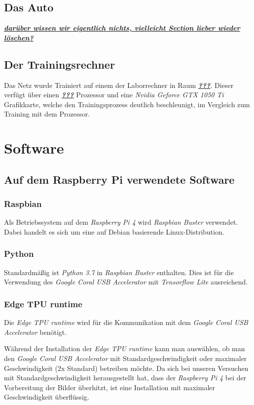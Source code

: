 \documentclass[a4paper, 12pt]{scrartcl}
\begin{document}
		
		\subsection{Das Auto}
		\textbf{\textit{\underline{darüber wissen wir eigentlich nichts, vielleicht Section lieber wieder löschen?}}}
	
	
		\subsection{Der Trainingsrechner}
		Das Netz wurde Trainiert auf einem der Laborrechner in Raum \textbf{\textit{\underline{???}}}. Dieser verfügt über einen \textbf{\textit{\underline{???}}} Prozessor und eine \emph{Nvidia Geforce GTX 1050 Ti} Grafikkarte, welche den Trainingsprozess deutlich beschleunigt, im Vergleich zum Training mit dem Prozessor.	
	
	\section{Software}
		\subsection{Auf dem Raspberry Pi verwendete Software}
			\subsubsection{Raspbian}
			Als Betriebssystem auf dem \emph{Raspberry Pi 4} wird \emph{Raspbian Buster} verwendet. Dabei handelt es sich um eine auf Debian basierende Linux-Distribution.
			
			
			\subsubsection{Python}
			Standardmäßig ist \emph{Python 3.7} in \emph{Raspbian Buster} enthalten. Dies ist für die Verwendung des \emph{Google Coral USB Accelerator} mit \emph{Tensorflow Lite} ausreichend.
			
			\subsubsection{Edge TPU runtime}
			Die \emph{Edge TPU runtime} wird für die Kommunikation mit dem \emph{Google Coral USB Accelerator} benötigt.
			
			Während der Installation der \emph{Edge TPU runtime} kann man auswählen, ob man den \emph{Google Coral USB Accelerator} mit Standardgeschwindigkeit oder maximaler Geschwindigkeit (2x Standard) betreiben möchte. Da sich bei unseren Versuchen mit Standardgeschwindigkeit herausgestellt hat, dass der \emph{Raspberry Pi 4} bei der Vorbereitung der Bilder überhitzt, ist eine Installation mit maximaler Geschwindigkeit überflüssig.
			
\end{document}
